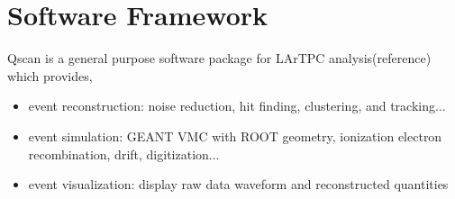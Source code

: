 \section{Software Framework}
Qscan is a general purpose software package for LArTPC analysis(reference)
which provides,
\begin{itemize}
\item event reconstruction:  noise reduction, hit finding, clustering, and tracking...
\item event simulation: GEANT VMC with ROOT geometry, ionization electron recombination, drift, digitization... 
\item event visualization: display raw data waveform and reconstructed quantities
\end{itemize}
